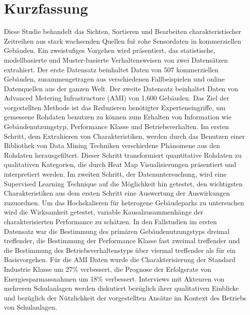 \chapter{Kurzfassung}

Diese Studie behandelt das Sichten, Sortieren und Bearbeiten charakteristischer Zeitreihen aus stark wachsenden Quellen fu\"r rohe Sensordaten in kommerziellen Gebäuden. Ein zweistufiges Vorgehen wird präsentiert, das statistische, modellbasierte und Muster-basierte Verhaltensweisen von zwei Datensätzen extrahiert. Der erste Datensatz beinhaltet Daten von 507 kommerziellen Gebäuden, zusammengetragen aus verschiedenen Fallbeispielen und online Datenquellen aus der ganzen Welt. Der zweite Datensatz beinhaltet Daten von Advanced Metering Infrastructure (AMI) von 1,600 Gebäuden. Das Ziel der vorgestellten Methode ist das Reduzieren benötigter Experteneingriffe, um gemessene Rohdaten benutzen zu können zum Erhalten von Information wie Gebäudenutzungstyp, Performance Klasse und Betriebsverhalten. Im ersten Schritt, dem Extrahieren von Charakteristiken, werden durch das Benutzen einer Bibliothek von Data Mining Techniken verschiedene Phänomene aus den Rohdaten herausgefiltert. Dieser Schritt transformiert quantitative Rohdaten zu qualitativen Kategorien, die durch Heat Map Visualisierungen präsentiert und interpretiert werden. Im zweiten Schritt, der Datenuntersuchung, wird eine Supervised Learning Technique auf die Möglichkeit hin getestet, den wichtigsten Charakteristiken aus dem ersten Schritt eine Auswertung der Auswirkungen zuzuordnen. Um das Hochskalieren für heterogene Gebäudeparks zu untersuchen wird die Wirksamkeit getestet, variable Kausalzusammenhänge der charakterisierten Performance zu schätzen. In den Fallstudien im ersten Datensatz war die Bestimmung des primären Gebäudenutzungstyps dreimal treffender, die Bestimmung der Performance Klasse fast zweimal treffender und die Bestimmung des Betriebsverhaltenstyps über viermal treffender als für ein Basisvorgehen. Für die AMI Daten wurde die Charakterisierung der Standard Industrie Klasse  um 27\% verbessert, die Prognose der Erfolgsrate von Energiesparmassnahmen um 18\% verbessert. Interviews mit Akteuren von mehreren Schulanlagen werden diskutiert bezüglich ihrer qualitativen Einblicke und bezüglich der Nützlichkeit der vorgestellten Ansätze im Kontext des Betriebs von Schulanlagen. 
